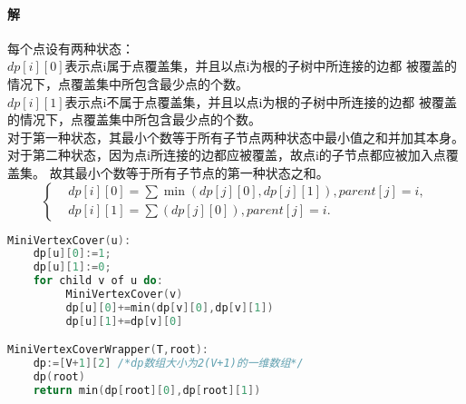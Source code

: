 \documentclass[11pt,a4paper,oneside,oldfontcommands]{ctexart}
\begin{document}
\paragraph*{解}
每个点设有两种状态：\\
$dp[i][0]$表示点i属于点覆盖集，并且以点i为根的子树中所连接的边都
被覆盖的情况下，点覆盖集中所包含最少点的个数。\\
$dp[i][1]$表示点i不属于点覆盖集，并且以点i为根的子树中所连接的边都
被覆盖的情况下，点覆盖集中所包含最少点的个数。\\
对于第一种状态，其最小个数等于所有子节点两种状态中最小值之和并加其本身。\\
对于第二种状态，因为点i所连接的边都应被覆盖，故点i的子节点都应被加入点覆盖集。
故其最小个数等于所有子节点的第一种状态之和。\\
$$\left\{
	\begin{aligned}
		&dp[i][0]=\sum\min(dp[j][0],dp[j][1]),parent[j]=i,\\
		&dp[i][1]=\sum(dp[j][0]),parent[j]=i.
	\end{aligned}
	\right.
$$
\begin{lstlisting}[language=C++,title=MiniVertexCover.func]
MiniVertexCover(u):
	dp[u][0]:=1;
	dp[u][1]:=0;
	for child v of u do:
         MiniVertexCover(v)
         dp[u][0]+=min(dp[v][0],dp[v][1])
		 dp[u][1]+=dp[v][0]

MiniVertexCoverWrapper(T,root):
	dp:=[V+1][2] /*dp数组大小为2(V+1)的一维数组*/
	dp(root)
	return min(dp[root][0],dp[root][1])
\end{lstlisting}
\end{document}
